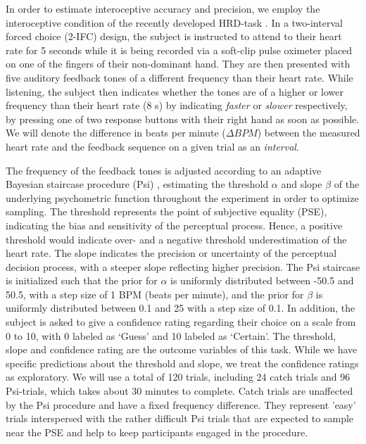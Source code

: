 \documentclass{article}
\begin{document}
In order to estimate interoceptive accuracy and precision, we employ the interoceptive condition of the recently developed HRD-task \parencite{legrand2022heart}. In a two-interval forced choice (2-IFC) design, the subject is instructed to attend to their heart rate for 5 seconds while it is being recorded via a soft-clip pulse oximeter placed on one of the fingers of their non-dominant hand. They are then presented with five auditory feedback tones of a different frequency than their heart rate. While listening, the subject then indicates whether the tones are of a higher or lower frequency than their heart rate (8 s) by indicating \emph{faster} or \emph{slower} respectively, by pressing one of two response buttons with their right hand as soon as possible. We will denote the difference in beats per minute ($\Delta BPM$) between the measured heart rate and the feedback sequence on a given trial as an \emph{interval}.


The frequency of the feedback tones is adjusted according to an adaptive Bayesian staircase procedure (Psi) \parencite{kontsevich1999bayesian}, estimating the threshold $\alpha$ and slope $\beta$ of the underlying psychometric function throughout the experiment in order to optimize sampling. The threshold represents the point of subjective equality (PSE), indicating the bias and sensitivity of the perceptual process. Hence, a positive threshold would indicate over- and a negative threshold underestimation of the heart rate. The slope indicates the precision or uncertainty of the perceptual decision process, with a steeper slope reflecting higher precision. The Psi staircase is initialized such that the prior for $\alpha$ is uniformly distributed between -50.5 and 50.5, with a step size of 1 BPM (beats per minute), and the prior for $\beta$ is uniformly distributed between 0.1 and 25 with a step size of 0.1. In addition, the subject is asked to give a confidence rating regarding their choice on a scale from 0 to 10, with 0 labeled as ‘Guess’ and 10 labeled as ‘Certain’. The threshold, slope and confidence rating are the outcome variables of this task. While we have specific predictions about the threshold and slope, we treat the confidence ratings as exploratory. We will use a total of 120 trials, including 24 catch trials and 96 Psi-trials, which takes about 30 minutes to complete. Catch trials are unaffected by the Psi procedure and have a fixed frequency difference. They represent 'easy' trials interspersed with the rather difficult Psi trials that are expected to sample near the PSE and help to keep participants engaged in the procedure.
      
\end{document}
